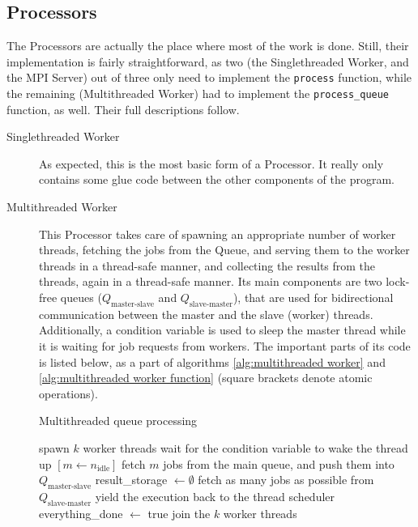 \documentclass[a4paper]{article}
\begin{document}
	\subsection{Processors}
	The Processors are actually the place where most of the work is done. Still, their implementation is fairly straightforward, as two (the Singlethreaded Worker, and the MPI Server) out of three only need to implement the \texttt{process} function, while the remaining (Multithreaded Worker) had to implement the \texttt{process\_queue} function, as well. Their full descriptions follow.
	\begin{description}
		\item[Singlethreaded Worker] As expected, this is the most basic form of a Processor. It really only contains some glue code between the other components of the program.
		\item[Multithreaded Worker] This Processor takes care of spawning an appropriate number of worker threads, fetching the jobs from the Queue, and serving them to the worker threads in a thread-safe manner, and collecting the results from the threads, again in a thread-safe manner. Its main components are two lock-free queues ($Q_\text{master-slave}$ and $Q_\text{slave-master}$), that are used for bidirectional communication between the master and the slave (worker) threads. Additionally, a condition variable is used to sleep the master thread while it is waiting for job requests from workers. The important parts of its code is listed below, as a part of algorithms \ref{alg:multithreaded worker} and \ref{alg:multithreaded worker function} (square brackets denote atomic operations).
		
		\begin{algorithm}
			\caption{Multithreaded queue processing} \label{alg:multithreaded worker}
			\begin{algorithmic}[1]
					\State spawn $k$ worker threads
						\State wait for the condition variable to wake the thread up
						\State $[m \gets n_\text{idle}]$
						\State fetch $m$ jobs from the main queue, and push them into $Q_\text{master-slave}$
					\EndWhile
					\State result\_storage $\gets \emptyset$
						\State fetch as many jobs as possible from $Q_\text{slave-master}$
						\State yield the execution back to the thread scheduler
					\EndWhile
					\State everything\_done $\gets$ true
					\State join the $k$ worker threads
				\EndProcedure
			\end{algorithmic}
		\end{algorithm}	
		

\end{description}
\end{document}
